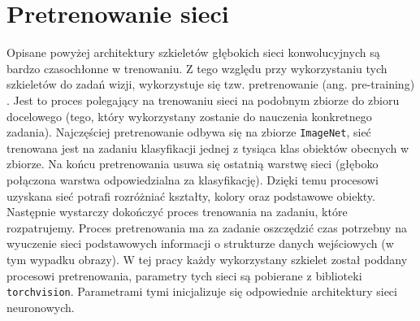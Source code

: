 \section{Pretrenowanie sieci}
Opisane powyżej architektury szkieletów głębokich sieci konwolucyjnych są bardzo czasochłonne w trenowaniu. Z tego względu przy wykorzystaniu tych szkieletów do zadań wizji, wykorzystuje się tzw. pretrenowanie (ang. pre-training) \cite{1901.09960}. Jest to proces polegający na trenowaniu sieci na podobnym zbiorze do zbioru docelowego (tego, który wykorzystany zostanie do nauczenia konkretnego zadania). Najczęściej pretrenowanie odbywa się na zbiorze \texttt{ImageNet}, sieć trenowana jest na zadaniu klasyfikacji jednej z tysiąca klas obiektów obecnych w zbiorze. Na końcu pretrenowania usuwa się ostatnią warstwę sieci (głęboko połączona warstwa odpowiedzialna za klasyfikację). Dzięki temu procesowi uzyskana sieć potrafi rozróżniać kształty, kolory oraz podstawowe obiekty. Następnie wystarczy dokończyć proces trenowania na zadaniu, które rozpatrujemy. Proces pretrenowania ma za zadanie oszczędzić czas potrzebny na wyuczenie sieci podstawowych informacji o strukturze danych wejściowych (w tym wypadku obrazy). W tej pracy każdy wykorzystany szkielet został poddany procesowi pretrenowania, parametry tych sieci są pobierane z biblioteki \texttt{torchvision}. Parametrami tymi inicjalizuje się odpowiednie architektury sieci neuronowych.